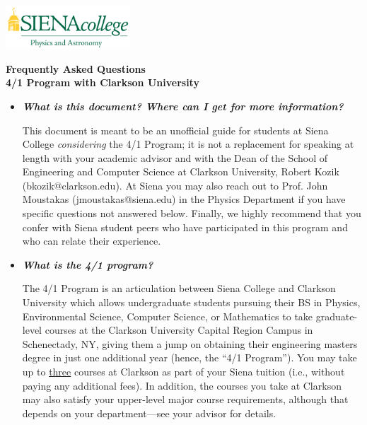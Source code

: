 \documentclass[12pt]{article}
\begin{document}
\hfill \includegraphics[width=0.35\textwidth]{siena_phys_astro_print_crop.jpg}

\vspace{0.2cm}
\begin{center}
{\LARGE {\bf Frequently Asked Questions}} \\
\medskip
{\Large {\bf 4/1 Program with Clarkson University}} 
\end{center}
\vspace{0.3cm}


\begin{itemize}
\item{{\bf {\em What is this document? Where can I get for more information?}} 

This document is meant to be an unofficial guide for students at Siena College
\emph{considering} the 4/1 Program; it is not a replacement for speaking at
length with your academic advisor and with the Dean of the School of Engineering
and Computer Science at Clarkson University, Robert Kozik (bkozik@clarkson.edu).
At Siena you may also reach out to Prof. John Moustakas (jmoustakas@siena.edu)
in the Physics Department if you have specific questions not answered below.
Finally, we highly recommend that you confer with Siena student peers who have
participated in this program and who can relate their experience.}

\item{{\bf {\em What is the 4/1 program?}}

The 4/1 Program is an articulation between Siena College and Clarkson University
which allows undergraduate students pursuing their BS in Physics, Environmental
Science, Computer Science, or Mathematics to take graduate-level courses at the
Clarkson University Capital Region Campus in Schenectady, NY, giving them a jump
on obtaining their engineering masters degree in just one additional year
(hence, the ``4/1 Program'').  You may take up to \underline{three} courses at
Clarkson as part of your Siena tuition (i.e., without paying any additional
fees).  In addition, the courses you take at Clarkson may also satisfy your
upper-level major course requirements, although that depends on your
department---see your advisor for details.}



\end{itemize}
\end{document}
